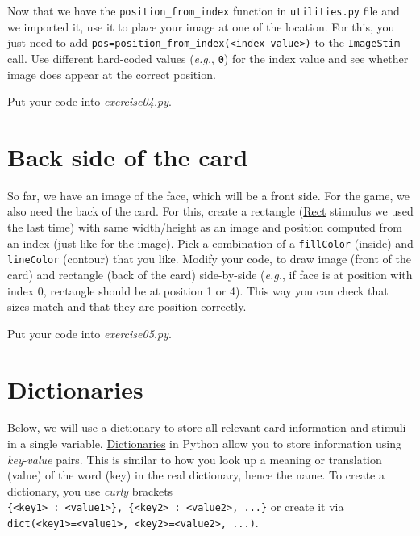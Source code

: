 \documentclass[
]{book}
\begin{document}
Now that we have the \texttt{position\_from\_index} function in \texttt{utilities.py} file and we imported it, use it to place your image at one of the location. For this, you just need to add \texttt{pos=position\_from\_index(\textless{}index\ value\textgreater{})} to the \texttt{ImageStim} call. Use different hard-coded values (\emph{e.g.}, \texttt{0}) for the index value and see whether image does appear at the correct position.

Put your code into \emph{exercise04.py}.

\hypertarget{back-side-of-the-card}{%
\section{Back side of the card}\label{back-side-of-the-card}}

So far, we have an image of the face, which will be a front side. For the game, we also need the back of the card. For this, create a rectangle (\href{https://psychopy.org/api/visual/rect.html}{Rect} stimulus we used the last time) with same width/height as an image and position computed from an index (just like for the image). Pick a combination of a \texttt{fillColor} (inside) and \texttt{lineColor} (contour) that you like. Modify your code, to draw image (front of the card) and rectangle (back of the card) side-by-side (\emph{e.g.}, if face is at position with index 0, rectangle should be at position 1 or 4). This way you can check that sizes match and that they are position correctly.

Put your code into \emph{exercise05.py}.

\hypertarget{dictionaries}{%
\section{Dictionaries}\label{dictionaries}}

Below, we will use a dictionary to store all relevant card information and stimuli in a single variable. \href{https://docs.python.org/3/library/stdtypes.html\#dict}{Dictionaries} in Python allow you to store information using \emph{key}-\emph{value} pairs. This is similar to how you look up a meaning or translation (value) of the word (key) in the real dictionary, hence the name. To create a dictionary, you use \emph{curly} brackets \texttt{\{\textless{}key1\textgreater{}\ :\ \textless{}value1\textgreater{}\},\ \{\textless{}key2\textgreater{}\ :\ \textless{}value2\textgreater{},\ ...\}} or create it via \texttt{dict(\textless{}key1\textgreater{}=\textless{}value1\textgreater{},\ \textless{}key2\textgreater{}=\textless{}value2\textgreater{},\ ...)}.
\end{document}
